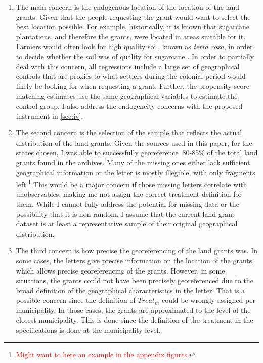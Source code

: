 \documentclass[11pt]{article}
\newcommand{\red}[1]{\textcolor{red}{#1}}
\begin{document}
\begin{enumerate}
  \item The main concern is the endogenous location of the location of the land grants. Given that the people requesting the grant would want to select the best location possible. 
  For example, historically, it is known that sugarcane plantations, and therefore the grants, were located in areas suitable for it. 
  Farmers would often look for high quality soil, known as \textit{terra roxa}, in order to decide whether the soil was of quality for sugarcane \parencite{Schwartz1985-wf}.
  In order to partially deal with this concern, all regressions include a large set of geographical controls that are proxies to what settlers during the colonial period would likely be looking for when requesting a grant. 
  Further, the propensity score matching estimates use the same geographical variables to estimate the control group.
  I also address the endogeneity concerns with the proposed instrument in \autoref{sec:iv}.

  \item The second concern is the selection of the sample that reflects the actual distribution of the land grants. 
  Given the sources used in this paper, for the states chosen, I was able to successfully georeference $~$80-85\% of the total land grants found in the archives. 
  Many of the missing ones either lack sufficient geographical information or the letter is mostly illegible, with only fragments left.\footnote{\red{Might want to here an example in the appendix figures.}}
  This would be a major concern if those missing letters correlate with unobservables, making me not assign the correct treatment definition for them.
  While I cannot fully address the potential for missing data or the possibility that it is non-random, I assume that the current land grant dataset is at least a representative sample of their original geographical distribution. 

  \item The third concern is how precise the georeferencing of the land grants was. 
  In some cases, the letters give precise information on the location of the grants, which allows precise georeferencing of the grants.
  However, in some situations, the grants could not have been precisely georeferenced due to the broad definition of the geographical characteristics in the letter. 
  That is a possible concern since the definition of $Treat_m$ could be wrongly assigned per municipality.
  In those cases, the grants are approximated to the level of the closest municipality.  
  This is done since the definition of the treatment in the specifications is done at the municipality level.
\end{enumerate}
\end{document}
